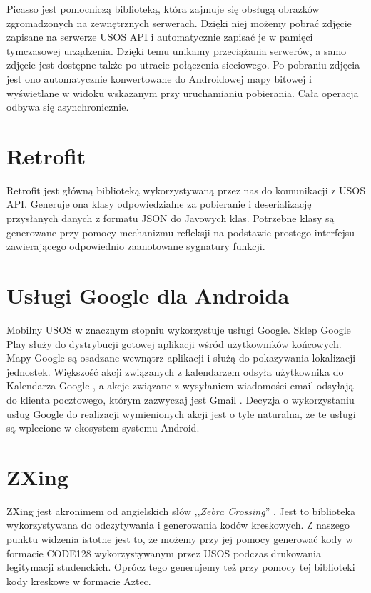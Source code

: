 \documentclass{pracamgr}
\begin{document}
Picasso \cite{picasso} jest pomocniczą biblioteką, która zajmuje się obsługą
obrazków zgromadzonych na zewnętrznych serwerach. Dzięki niej możemy pobrać
zdjęcie zapisane na serwerze USOS API i automatycznie zapisać je w pamięci
tymczasowej urządzenia. Dzięki temu unikamy przeciążania serwerów, a samo zdjęcie
jest dostępne także po utracie połączenia sieciowego. Po pobraniu zdjęcia
jest ono automatycznie konwertowane do Androidowej mapy bitowej i wyświetlane w
widoku wskazanym przy uruchamianiu pobierania. Cała operacja odbywa się asynchronicznie.

\section{Retrofit}

Retrofit \cite{retrofit} jest główną biblioteką wykorzystywaną przez nas do
komunikacji z USOS API. Generuje ona klasy odpowiedzialne za pobieranie i
deserializację przysłanych danych z formatu JSON do Javowych klas. Potrzebne klasy
są generowane przy pomocy mechanizmu refleksji na podstawie prostego interfejsu
zawierającego odpowiednio zaanotowane sygnatury funkcji.

\section{Usługi Google dla Androida}

Mobilny USOS w znacznym stopniu wykorzystuje usługi Google. Sklep Google Play
\cite{googleplay} służy do dystrybucji gotowej aplikacji wśród użytkowników
końcowych. Mapy Google \cite{googlemaps} są osadzane wewnątrz aplikacji i służą
do pokazywania lokalizacji jednostek. Większość akcji związanych z kalendarzem
odsyła użytkownika do Kalendarza Google \cite{googlecalendar}, a akcje związane
z wysyłaniem wiadomości email odsyłają do klienta pocztowego, którym zazwyczaj
jest Gmail \cite{gmail}. Decyzja o wykorzystaniu usług Google do realizacji
wymienionych akcji jest o tyle naturalna, że te usługi są wplecione w ekosystem
systemu Android.

\section{ZXing}

ZXing jest akronimem od angielskich słów ,,\textit{Zebra Crossing}'' \cite{zxing}.
Jest to biblioteka wykorzystywana do odczytywania i generowania kodów kreskowych.
Z naszego punktu widzenia istotne jest to, że możemy przy jej pomocy generować
kody w formacie CODE128 wykorzystywanym przez USOS podczas drukowania legitymacji
studenckich. Oprócz tego generujemy też przy pomocy tej biblioteki kody kreskowe
w formacie Aztec.
\end{document}
